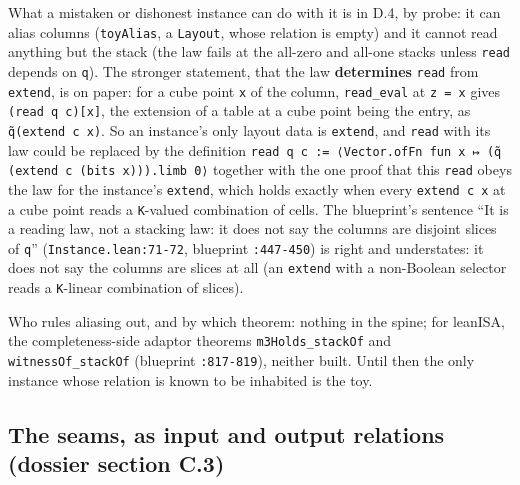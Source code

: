 What a mistaken or dishonest instance can do with it is in D.4, by probe: it can alias columns (\texttt{toyAlias}, a \texttt{Layout}, whose relation is empty) and it cannot read anything but the stack (the law fails at the all-zero and all-one stacks unless \texttt{read} depends on \texttt{q}). The stronger statement, that the law \textbf{determines} \texttt{read} from \texttt{extend}, is on paper: for a cube point \texttt{x} of the column, \texttt{read\_\allowbreak{}eval} at \texttt{z = x} gives \texttt{(\allowbreak{}read q c)[x]}, the extension of a table at a cube point being the entry, as \texttt{q̃(\allowbreak{}extend c x)}. So an instance's only layout data is \texttt{extend}, and \texttt{read} with its law could be replaced by the definition \texttt{r\allowbreak{}e\allowbreak{}a\allowbreak{}d\allowbreak{} q\allowbreak{} c\allowbreak{} :\allowbreak{}=\allowbreak{} ⟨\allowbreak{}V\allowbreak{}e\allowbreak{}c\allowbreak{}t\allowbreak{}o\allowbreak{}r\allowbreak{}.\allowbreak{}o\allowbreak{}f\allowbreak{}F\allowbreak{}n\allowbreak{} f\allowbreak{}u\allowbreak{}n\allowbreak{} x\allowbreak{} ↦\allowbreak{} (\allowbreak{}q̃\allowbreak{} (\allowbreak{}e\allowbreak{}x\allowbreak{}t\allowbreak{}e\allowbreak{}n\allowbreak{}d\allowbreak{} c\allowbreak{} (\allowbreak{}b\allowbreak{}i\allowbreak{}t\allowbreak{}s\allowbreak{} x\allowbreak{})\allowbreak{})\allowbreak{})\allowbreak{}.\allowbreak{}l\allowbreak{}i\allowbreak{}m\allowbreak{}b\allowbreak{} 0\allowbreak{}⟩} together with the one proof that this \texttt{read} obeys the law for the instance's \texttt{extend}, which holds exactly when every \texttt{extend c x} at a cube point reads a \texttt{K}-valued combination of cells. The blueprint's sentence \enquote{It is a reading law, not a stacking law: it does not say the columns are disjoint slices of \texttt{q}} (\texttt{Instance.\allowbreak{}lean:71-{}72}, blueprint \texttt{:447-{}450}) is right and understates: it does not say the columns are slices at all (an \texttt{extend} with a non-Boolean selector reads a \texttt{K}-linear combination of slices).

Who rules aliasing out, and by which theorem: nothing in the spine; for leanISA, the completeness-side adaptor theorems \texttt{m3Holds\_\allowbreak{}stackOf} and \texttt{witnessOf\_\allowbreak{}stackOf} (blueprint \texttt{:817-{}819}), neither built. Until then the only instance whose relation is known to be inhabited is the toy.

\subsection{The seams, as input and output relations (dossier section C.3)}\label{sec:gen-spine-C3}

